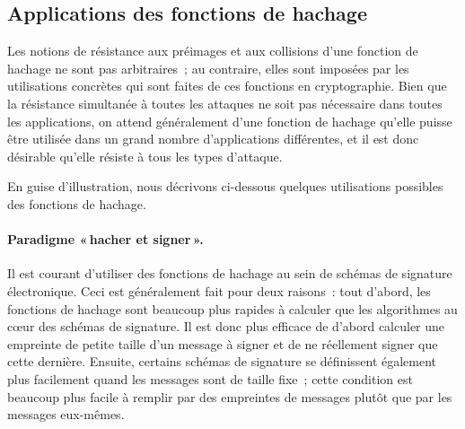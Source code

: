 
\subsection{Applications des fonctions de hachage}

Les notions de résistance aux préimages et aux collisions d'une fonction de hachage ne sont pas arbitraires~; au contraire, elles sont imposées par
les utilisations concrètes qui sont faites de ces fonctions en cryptographie.
Bien que la résistance simultanée à toutes les attaques ne soit pas nécessaire dans toutes les applications,
on attend généralement d'une fonction de hachage qu'elle puisse être utilisée
dans un grand nombre d'applications différentes, et il est donc désirable qu'elle résiste à tous les types d'attaque.

En guise d'illustration, nous décrivons ci-dessous quelques utilisations possibles des fonctions de hachage.

\paragraph{Paradigme «\,hacher et signer\,».}
Il est courant d'utiliser des fonctions de hachage au sein de schémas de signature électronique.
Ceci est généralement fait pour deux raisons~: tout d'abord, les fonctions de hachage sont beaucoup
plus rapides à calculer que les algorithmes au c\oe ur des schémas de signature. Il est donc plus
efficace de d'abord calculer une empreinte de petite taille d'un message à signer et de ne réellement signer que cette dernière.
Ensuite, certains schémas de signature se définissent également plus facilement quand les messages sont
de taille fixe~; cette condition est beaucoup plus facile à remplir par des empreintes de messages plutôt que par les messages eux-mêmes.

